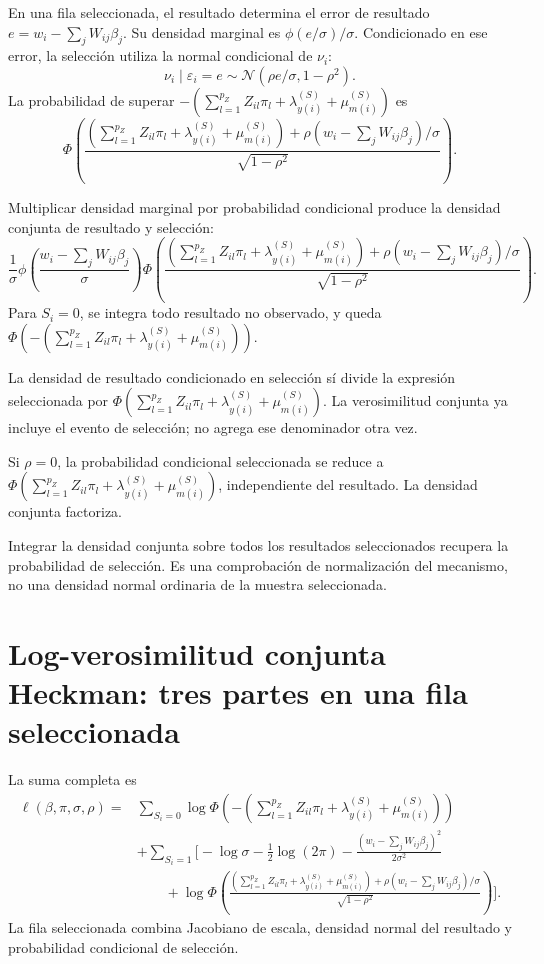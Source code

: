 \documentclass[11pt,a4paper]{article}
\begin{document}
En una fila seleccionada, el resultado
determina el error de resultado
\(e=w_i-\sum_jW_{ij}\beta_j\).
Su densidad marginal es
\(\phi(e/\sigma)/\sigma\).
Condicionado en ese error,
la selección utiliza la
normal condicional de \(\nu_i\):
\[
\nu_i\mid\varepsilon_i=e
\sim\mathcal N(\rho e/\sigma,1-\rho^2).
\]
La probabilidad de superar
\(-\left(\sum_{l=1}^{p_Z}Z_{il}\pi_l+\lambda_{y(i)}^{(S)}+\mu_{m(i)}^{(S)}\right)\)
es
\[
\Phi\left(
\frac{\left(\sum_{l=1}^{p_Z}Z_{il}\pi_l+\lambda_{y(i)}^{(S)}+\mu_{m(i)}^{(S)}\right)+
\rho(w_i-\sum_jW_{ij}\beta_j)/\sigma}
{\sqrt{1-\rho^2}}\right).
\]

Multiplicar densidad marginal por
probabilidad condicional produce
la densidad conjunta de
resultado y selección:
\[
\boxed{
\frac1\sigma
\phi\left(\frac{w_i-\sum_jW_{ij}\beta_j}{\sigma}\right)
\Phi\left(
\frac{\left(\sum_{l=1}^{p_Z}Z_{il}\pi_l+\lambda_{y(i)}^{(S)}+\mu_{m(i)}^{(S)}\right)+
\rho(w_i-\sum_jW_{ij}\beta_j)/\sigma}
{\sqrt{1-\rho^2}}\right)}.
\]
Para \(S_i=0\), se integra
todo resultado no observado,
y queda
\(\Phi(-\left(\sum_{l=1}^{p_Z}Z_{il}\pi_l+\lambda_{y(i)}^{(S)}+\mu_{m(i)}^{(S)}\right))\).

La densidad de resultado
condicionado en selección sí
divide la expresión seleccionada
por \(\Phi(\sum_{l=1}^{p_Z}Z_{il}\pi_l+\lambda_{y(i)}^{(S)}+\mu_{m(i)}^{(S)})\).
La verosimilitud conjunta ya
incluye el evento de selección;
no agrega ese denominador
otra vez.

\begin{ejemplo}[Independencia]
Si \(\rho=0\), la probabilidad
condicional seleccionada se
reduce a \(\Phi(\sum_{l=1}^{p_Z}Z_{il}\pi_l+\lambda_{y(i)}^{(S)}+\mu_{m(i)}^{(S)})\),
independiente del resultado.
La densidad conjunta factoriza.
\end{ejemplo}
Integrar la densidad conjunta
sobre todos los resultados
seleccionados recupera
la probabilidad de selección.
Es una comprobación de
normalización del mecanismo,
no una densidad normal
ordinaria de la muestra seleccionada.


\clearpage
\section{Log-verosimilitud conjunta Heckman: tres partes en una fila seleccionada}

La suma completa es
\[
\begin{aligned}
\ell(\beta,\pi,\sigma,\rho)
={}&\sum_{S_i=0}\log\Phi(-\left(\sum_{l=1}^{p_Z}Z_{il}\pi_l+\lambda_{y(i)}^{(S)}+\mu_{m(i)}^{(S)}\right))\\
&+\sum_{S_i=1}\Bigg[
-\log\sigma-\frac12\log(2\pi)
-\frac{(w_i-\sum_jW_{ij}\beta_j)^2}{2\sigma^2}\\
&\qquad+
\log\Phi\left(
\frac{\left(\sum_{l=1}^{p_Z}Z_{il}\pi_l+\lambda_{y(i)}^{(S)}+\mu_{m(i)}^{(S)}\right)+
\rho(w_i-\sum_jW_{ij}\beta_j)/\sigma}
{\sqrt{1-\rho^2}}\right)
\Bigg].
\end{aligned}
\]
La fila seleccionada combina
Jacobiano de escala, densidad
normal del resultado y
probabilidad condicional de selección.
\end{document}
